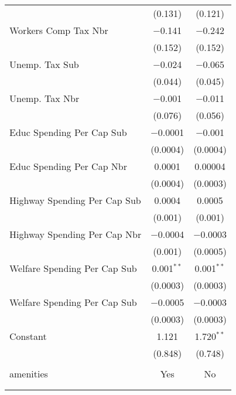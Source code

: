 \begin{table}[!htbp]
\begin{tabular}{@{\extracolsep{5pt}}lcc}
  & (0.131) & (0.121) \\ 
  Workers Comp Tax Nbr & $-$0.141 & $-$0.242 \\ 
  & (0.152) & (0.152) \\ 
  Unemp. Tax Sub & $-$0.024 & $-$0.065 \\ 
  & (0.044) & (0.045) \\ 
  Unemp. Tax Nbr & $-$0.001 & $-$0.011 \\ 
  & (0.076) & (0.056) \\ 
  Educ Spending Per Cap Sub & $-$0.0001 & $-$0.001 \\ 
  & (0.0004) & (0.0004) \\ 
  Educ Spending Per Cap Nbr & 0.0001 & 0.00004 \\ 
  & (0.0004) & (0.0003) \\ 
  Highway Spending Per Cap Sub & 0.0004 & 0.0005 \\ 
  & (0.001) & (0.001) \\ 
  Highway Spending Per Cap Nbr & $-$0.0004 & $-$0.0003 \\ 
  & (0.001) & (0.0005) \\ 
  Welfare Spending Per Cap Sub & 0.001$^{**}$ & 0.001$^{**}$ \\ 
  & (0.0003) & (0.0003) \\ 
  Welfare Spending Per Cap Sub & $-$0.0005 & $-$0.0003 \\ 
  & (0.0003) & (0.0003) \\ 
  Constant & 1.121 & 1.720$^{**}$ \\ 
  & (0.848) & (0.748) \\ 
 \hline \\[-1.8ex] 
amenities & Yes & No \\ 
\hline \\[-1.8ex] 
\hline 
\hline \\[-1.8ex] 
\end{tabular} 
\end{table} 
